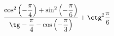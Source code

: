 \begin{ex}[type=calculate]
	\begin{condition}
		\( \dfrac{\cos^2\left( -\dfrac{\pi}{4} \right)+\sin^2\left( -\dfrac{\pi}{6} \right)}{\tg -\dfrac{\pi}{4} - \cos\left( -\dfrac{\pi}{3} \right)} +\ctg^2\dfrac{\pi}{6}\)
	\end{condition}
\end{ex}